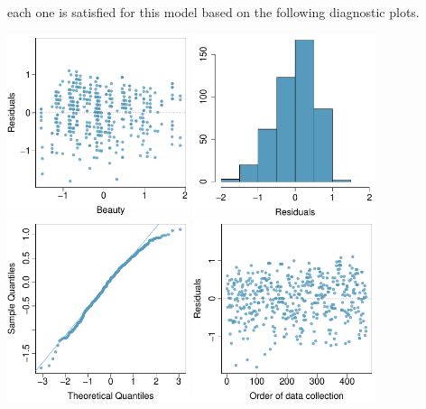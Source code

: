 {\begin{parts}
each one is satisfied for this model based on the following 
diagnostic plots.
\begin{center}
\includegraphics[width=0.4\textwidth]{ch_regr_simple_linear/figures/eoce/full_lin_regr_1/rate_my_prof_residuals.pdf}
\includegraphics[width=0.4\textwidth]{ch_regr_simple_linear/figures/eoce/full_lin_regr_1/rate_my_prof_residuals_hist.pdf} \\
\includegraphics[width=0.4\textwidth]{ch_regr_simple_linear/figures/eoce/full_lin_regr_1/rate_my_prof_residuals_qq.pdf}
\includegraphics[width=0.4\textwidth]{ch_regr_simple_linear/figures/eoce/full_lin_regr_1/rate_my_prof_residuals_order.pdf}
\end{center}
\end{parts}
}{}


